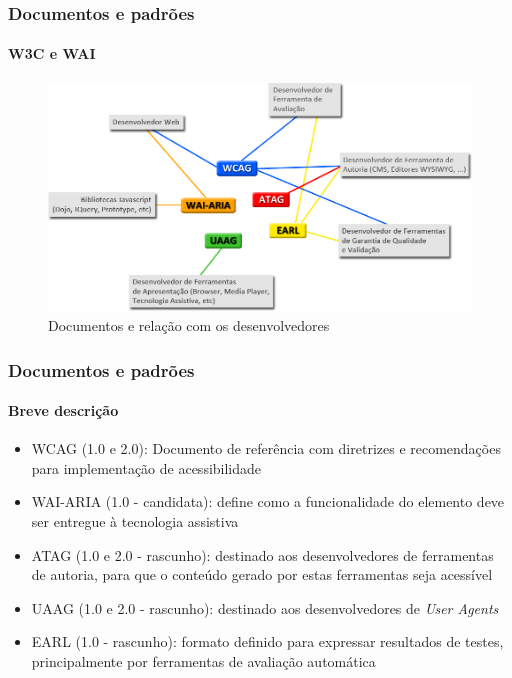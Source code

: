 \documentclass{beamer}
\begin{document}
\begin{frame}
\frametitle{Documentos e padrões}
\framesubtitle{W3C e WAI}

\begin{figure}[htbp] \centering
	\includegraphics[width=\textwidth]{./img/relation.jpg}
	\caption{Documentos e relação com os desenvolvedores}
	\label{fig:sub4}
\end{figure}

\end{frame}

\begin{frame}
\frametitle{Documentos e padrões}
\framesubtitle{Breve descrição}

\begin{itemize}
  \item WCAG (1.0 e 2.0): Documento de referência com diretrizes e recomendações para implementação de acessibilidade
  \item WAI-ARIA (1.0 - candidata): define como a funcionalidade do elemento deve ser entregue à tecnologia assistiva
  \item ATAG (1.0 e 2.0 - rascunho): destinado aos desenvolvedores de ferramentas de autoria, para que o conteúdo gerado por estas ferramentas seja acessível
  \item UAAG (1.0 e 2.0 - rascunho): destinado aos desenvolvedores de
  \textit{User Agents}
  \item EARL (1.0 - rascunho): formato definido para expressar resultados de testes, principalmente por ferramentas de avaliação automática 
\end{itemize}

\end{frame}
\end{document}
